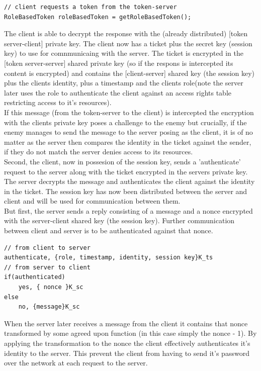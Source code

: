\begin{lstlisting}
// client requests a token from the token-server
RoleBasedToken roleBasedToken = getRoleBasedToken();

\end{lstlisting}


The client is able to decrypt the response with the (already distributed) [token server-client] private key. The client now has a ticket plus the secret key (session key) to use for comnmunicaing with the server. The ticket is encrypted in the [token server-server] shared private key (so if the respons is intercepted its content is encrypted) and contains the [client-server] shared key (the session key) plus the clients identity, plus a timestamp and the clients role(note the server later uses the role to authenticate the client against an access rights table restricting access to it's resources). \\ 

If this message (from the token-server to the client) is intercepted the encryption with the clients private key poses a challenge to the enemy but crucially, if the enemy manages to send the message to the server posing as the client, it is of no matter as the server then compares the identity in the ticket against the sender, if they do not match the server denies access to its resources.\\

Second, the client, now in possesion of the session key, sends a 'authenticate' request to the server along with the ticket encrypted in the servers private key. The server decrypts the message and authenticates the client against the identity in the ticket. The session key has now been distributed between the server and client and will be used for communication between them. \\ 

But first, the server sends a reply consisting of a message and a nonce encrypted with the server-client shared key (the session key). Further communication between client and server is to be authenticated against that nonce.

\begin{lstlisting}
// from client to server
authenticate, {role, timestamp, identity, session key}K_ts 
// from server to client
if(authenticated)
	yes, { nonce }K_sc
else
	no, {message}K_sc
\end{lstlisting}

When the server later receives a message from the client it contains that nonce transformed by some agreed upon function (in this case simply the nonce - 1). By applying the transformation to the nonce the client effectively authenticates it's identity to the server. This prevent the client from having to send it's password over the network at each request to the server. \\

